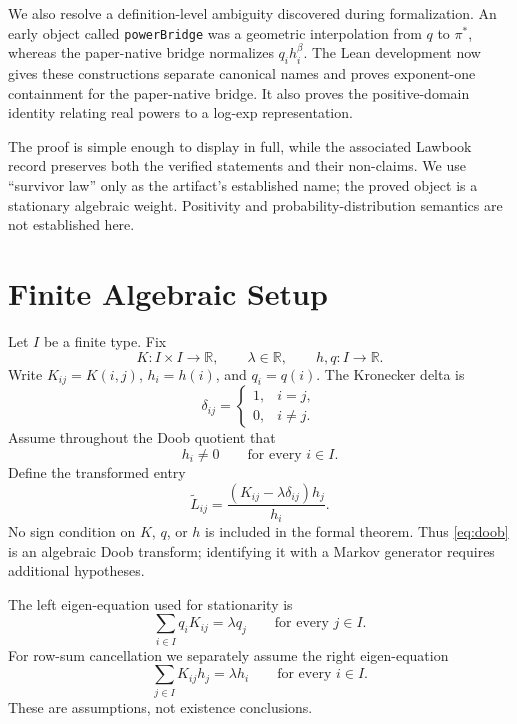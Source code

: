 \documentclass[10pt]{article}
\newcommand{\R}{\mathbb{R}}
\newcommand{\pistar}{\pi^{*}}
\newcommand{\Ltilde}{\widetilde L}
\begin{document}
We also resolve a definition-level ambiguity discovered during formalization.
An early object called \texttt{powerBridge} was a geometric interpolation from
\(q\) to \(\pistar\), whereas the paper-native bridge normalizes
\(q_i h_i^\beta\). The Lean development now gives these constructions separate
canonical names and proves exponent-one containment for the paper-native
bridge. It also proves the positive-domain identity relating real powers to a
log-exp representation.

The proof is simple enough to display in full, while the associated Lawbook
record preserves both the verified statements and their non-claims. We use
``survivor law'' only as the artifact's established name; the proved object is
a stationary algebraic weight. Positivity and probability-distribution
semantics are not established here.

\section{Finite Algebraic Setup}

Let \(I\) be a finite type. Fix
\[
  K : I\times I\to\R,\qquad
  \lambda\in\R,\qquad
  h,q:I\to\R.
\]
Write \(K_{ij}=K(i,j)\), \(h_i=h(i)\), and \(q_i=q(i)\). The Kronecker delta is
\[
  \delta_{ij} =
  \begin{cases}
    1,& i=j,\\
    0,& i\ne j.
  \end{cases}
\]
Assume throughout the Doob quotient that
\begin{equation}\label{eq:h-nonzero}
  h_i\ne 0\qquad\text{for every }i\in I.
\end{equation}
Define the transformed entry
\begin{equation}\label{eq:doob}
  \Ltilde_{ij}
  =
  \frac{(K_{ij}-\lambda\delta_{ij})h_j}{h_i}.
\end{equation}
No sign condition on \(K\), \(q\), or \(h\) is included in the formal theorem.
Thus \eqref{eq:doob} is an algebraic Doob transform; identifying it with a
Markov generator requires additional hypotheses.

The left eigen-equation used for stationarity is
\begin{equation}\label{eq:left}
  \sum_{i\in I} q_i K_{ij}=\lambda q_j
  \qquad\text{for every }j\in I.
\end{equation}
For row-sum cancellation we separately assume the right eigen-equation
\begin{equation}\label{eq:right}
  \sum_{j\in I}K_{ij}h_j=\lambda h_i
  \qquad\text{for every }i\in I.
\end{equation}
These are assumptions, not existence conclusions.
\end{document}
